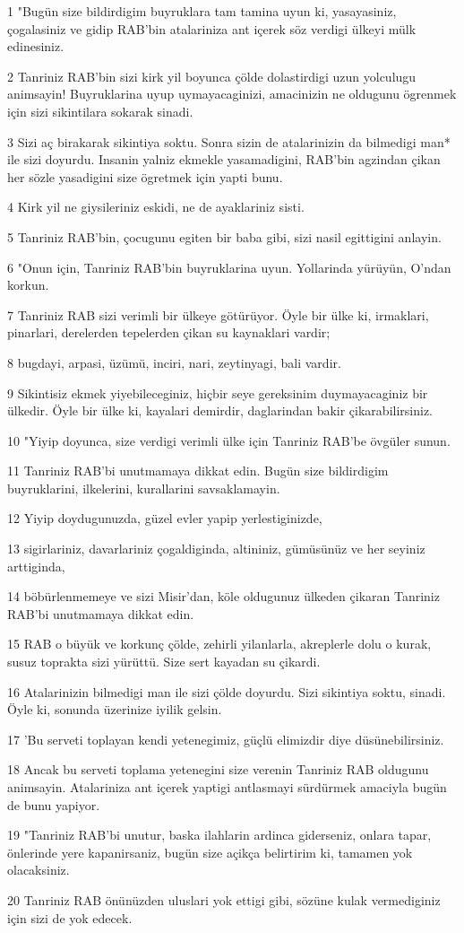 \par 1 "Bugün size bildirdigim buyruklara tam tamina uyun ki, yasayasiniz, çogalasiniz ve gidip RAB'bin atalariniza ant içerek söz verdigi ülkeyi mülk edinesiniz.
\par 2 Tanriniz RAB'bin sizi kirk yil boyunca çölde dolastirdigi uzun yolculugu animsayin! Buyruklarina uyup uymayacaginizi, amacinizin ne oldugunu ögrenmek için sizi sikintilara sokarak sinadi.
\par 3 Sizi aç birakarak sikintiya soktu. Sonra sizin de atalarinizin da bilmedigi man* ile sizi doyurdu. Insanin yalniz ekmekle yasamadigini, RAB'bin agzindan çikan her sözle yasadigini size ögretmek için yapti bunu.
\par 4 Kirk yil ne giysileriniz eskidi, ne de ayaklariniz sisti.
\par 5 Tanriniz RAB'bin, çocugunu egiten bir baba gibi, sizi nasil egittigini anlayin.
\par 6 "Onun için, Tanriniz RAB'bin buyruklarina uyun. Yollarinda yürüyün, O'ndan korkun.
\par 7 Tanriniz RAB sizi verimli bir ülkeye götürüyor. Öyle bir ülke ki, irmaklari, pinarlari, derelerden tepelerden çikan su kaynaklari vardir;
\par 8 bugdayi, arpasi, üzümü, inciri, nari, zeytinyagi, bali vardir.
\par 9 Sikintisiz ekmek yiyebileceginiz, hiçbir seye gereksinim duymayacaginiz bir ülkedir. Öyle bir ülke ki, kayalari demirdir, daglarindan bakir çikarabilirsiniz.
\par 10 "Yiyip doyunca, size verdigi verimli ülke için Tanriniz RAB'be övgüler sunun.
\par 11 Tanriniz RAB'bi unutmamaya dikkat edin. Bugün size bildirdigim buyruklarini, ilkelerini, kurallarini savsaklamayin.
\par 12 Yiyip doydugunuzda, güzel evler yapip yerlestiginizde,
\par 13 sigirlariniz, davarlariniz çogaldiginda, altininiz, gümüsünüz ve her seyiniz arttiginda,
\par 14 böbürlenmemeye ve sizi Misir'dan, köle oldugunuz ülkeden çikaran Tanriniz RAB'bi unutmamaya dikkat edin.
\par 15 RAB o büyük ve korkunç çölde, zehirli yilanlarla, akreplerle dolu o kurak, susuz toprakta sizi yürüttü. Size sert kayadan su çikardi.
\par 16 Atalarinizin bilmedigi man ile sizi çölde doyurdu. Sizi sikintiya soktu, sinadi. Öyle ki, sonunda üzerinize iyilik gelsin.
\par 17 'Bu serveti toplayan kendi yetenegimiz, güçlü elimizdir diye düsünebilirsiniz.
\par 18 Ancak bu serveti toplama yetenegini size verenin Tanriniz RAB oldugunu animsayin. Atalariniza ant içerek yaptigi antlasmayi sürdürmek amaciyla bugün de bunu yapiyor.
\par 19 "Tanriniz RAB'bi unutur, baska ilahlarin ardinca giderseniz, onlara tapar, önlerinde yere kapanirsaniz, bugün size açikça belirtirim ki, tamamen yok olacaksiniz.
\par 20 Tanriniz RAB önünüzden uluslari yok ettigi gibi, sözüne kulak vermediginiz için sizi de yok edecek.

